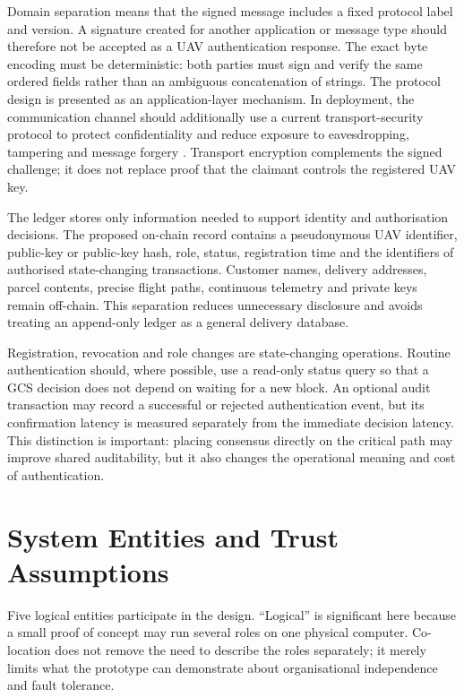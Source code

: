 Domain separation means that the signed message includes a fixed protocol label and version. A signature created for another application or message type should therefore not be accepted as a UAV authentication response. The exact byte encoding must be deterministic: both parties must sign and verify the same ordered fields rather than an ambiguous concatenation of strings. The protocol design is presented as an application-layer mechanism. In deployment, the communication channel should additionally use a current transport-security protocol to protect confidentiality and reduce exposure to eavesdropping, tampering and message forgery \cite{RFC9846}. Transport encryption complements the signed challenge; it does not replace proof that the claimant controls the registered UAV key.

The ledger stores only information needed to support identity and authorisation decisions. The proposed on-chain record contains a pseudonymous UAV identifier, public-key or public-key hash, role, status, registration time and the identifiers of authorised state-changing transactions. Customer names, delivery addresses, parcel contents, precise flight paths, continuous telemetry and private keys remain off-chain. This separation reduces unnecessary disclosure and avoids treating an append-only ledger as a general delivery database.

Registration, revocation and role changes are state-changing operations. Routine authentication should, where possible, use a read-only status query so that a GCS decision does not depend on waiting for a new block. An optional audit transaction may record a successful or rejected authentication event, but its confirmation latency is measured separately from the immediate decision latency. This distinction is important: placing consensus directly on the critical path may improve shared auditability, but it also changes the operational meaning and cost of authentication.

\section{System Entities and Trust Assumptions}
\label{sec:entities-trust}

Five logical entities participate in the design. ``Logical'' is significant here because a small proof of concept may run several roles on one physical computer. Co-location does not remove the need to describe the roles separately; it merely limits what the prototype can demonstrate about organisational independence and fault tolerance.

